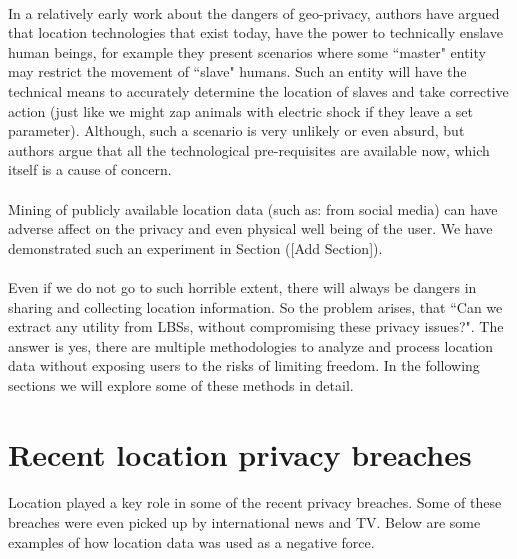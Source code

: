 \documentclass[12pt]{report}
\theoremstyle{named}
\begin{document}
\paragraph{}
In a relatively early work \cite{dobson2003geoslavery} about the dangers of geo-privacy, authors have argued that location technologies that exist today, have the power to technically enslave human beings, for example they present scenarios where some ``master" entity may restrict the movement of ``slave" humans. Such an entity will have the technical means to accurately determine the location of slaves and take corrective action (just like we might zap animals with electric shock if they leave a set parameter). Although, such a scenario is very unlikely or even absurd, but authors argue that all the technological pre-requisites are available now, which itself is a cause of concern.

\paragraph{}
Mining of publicly available location data (such as: from social media) can have adverse affect on the privacy and even physical well being of the user. We have demonstrated such an experiment in Section ([Add Section]). 



\paragraph{}
Even if we do not go to such horrible extent, there will always be dangers in sharing and collecting location information. So the problem arises, that ``Can we extract any utility from LBSs, without compromising these privacy issues?". The answer is yes, there are multiple methodologies to analyze and process location data without exposing users to the risks of limiting freedom.  In the following sections we will explore some of these methods in detail.

\section{Recent location privacy breaches}
\paragraph{}
Location played a key role in some of the recent privacy breaches. Some of these breaches were even picked up by international news and TV. Below are some examples of how location data was used as a negative force.
\end{document}
